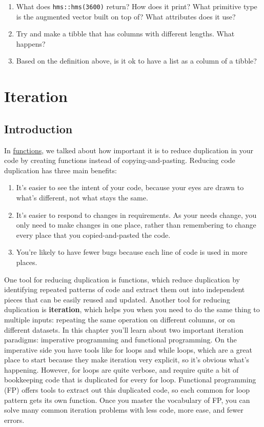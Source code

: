 \documentclass[]{book}
\begin{document}
\begin{enumerate}
\def\labelenumi{\arabic{enumi}.}
\item
  What does \texttt{hms::hms(3600)} return? How does it print? What
  primitive type is the augmented vector built on top of? What
  attributes does it use?
\item
  Try and make a tibble that has columns with different lengths. What
  happens?
\item
  Based on the definition above, is it ok to have a list as a column of
  a tibble?
\end{enumerate}

\hypertarget{iteration}{\chapter{Iteration}\label{iteration}}

\section{Introduction}\label{introduction-14}

In \protect\hyperlink{functions}{functions}, we talked about how
important it is to reduce duplication in your code by creating functions
instead of copying-and-pasting. Reducing code duplication has three main
benefits:

\begin{enumerate}
\def\labelenumi{\arabic{enumi}.}
\item
  It's easier to see the intent of your code, because your eyes are
  drawn to what's different, not what stays the same.
\item
  It's easier to respond to changes in requirements. As your needs
  change, you only need to make changes in one place, rather than
  remembering to change every place that you copied-and-pasted the code.
\item
  You're likely to have fewer bugs because each line of code is used in
  more places.
\end{enumerate}

One tool for reducing duplication is functions, which reduce duplication
by identifying repeated patterns of code and extract them out into
independent pieces that can be easily reused and updated. Another tool
for reducing duplication is \textbf{iteration}, which helps you when you
need to do the same thing to multiple inputs: repeating the same
operation on different columns, or on different datasets. In this
chapter you'll learn about two important iteration paradigms: imperative
programming and functional programming. On the imperative side you have
tools like for loops and while loops, which are a great place to start
because they make iteration very explicit, so it's obvious what's
happening. However, for loops are quite verbose, and require quite a bit
of bookkeeping code that is duplicated for every for loop. Functional
programming (FP) offers tools to extract out this duplicated code, so
each common for loop pattern gets its own function. Once you master the
vocabulary of FP, you can solve many common iteration problems with less
code, more ease, and fewer errors.
\end{document}
